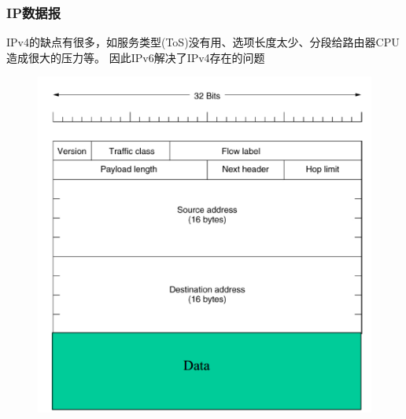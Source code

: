\subsubsection{IP数据报}
IPv4的缺点有很多，如服务类型(ToS)没有用、选项长度太少、分段给路由器CPU造成很大的压力等。
因此IPv6解决了IPv4存在的问题
\begin{figure}[H]
	\centering
	\includegraphics[width=0.6\linewidth]{fig/ipv6-format.png}
\end{figure}
